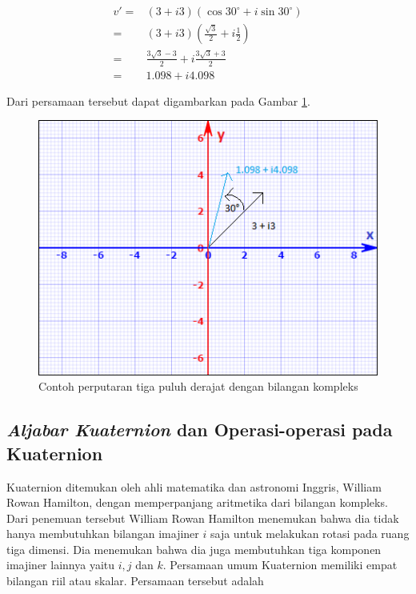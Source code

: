 \begin{equation}
	\begin{split}
		v' = &(3 + i3)(\cos 30^{\circ} + i \sin 30^{\circ})\\
		= & (3 + i3)(\frac{\sqrt{3}}{2} + i \frac{1}{2})\\
		= & \frac{3\sqrt{3}-3}{2} + i\frac{3\sqrt{3}+3}{2}\\
		= & 1.098 + i4.098
	\end{split}
\label{eq:rotasi_kompleks_tiga_puluh_derajat}
\end{equation}

Dari persamaan tersebut dapat digambarkan pada Gambar \ref{fig:diagram-rotasi-kompleks1}.

\begin{figure}[htbp]
\centering
\includegraphics[scale=1]{Gambar/diagram-rotasi-kompleks1.PNG}
\caption{Contoh perputaran tiga puluh derajat dengan bilangan kompleks} 
\label{fig:diagram-rotasi-kompleks1}
\end{figure}
\subsection{\textit{Aljabar Kuaternion} dan Operasi-operasi pada Kuaternion}

Kuaternion ditemukan oleh ahli matematika dan astronomi Inggris, William Rowan Hamilton, dengan memperpanjang aritmetika dari bilangan kompleks.\cite{kuipers:1999} Dari penemuan tersebut William Rowan Hamilton menemukan bahwa dia tidak hanya membutuhkan bilangan imajiner \(i\) saja untuk melakukan rotasi pada ruang tiga dimensi. Dia menemukan bahwa dia juga membutuhkan tiga komponen imajiner lainnya yaitu \(i,j\) dan \(k\). Persamaan umum Kuaternion memiliki empat bilangan riil atau skalar. Persamaan tersebut adalah 

